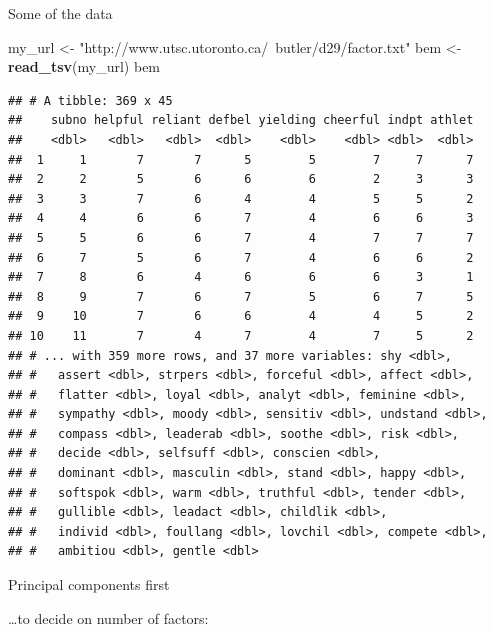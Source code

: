 \documentclass[
  ignorenonframetext,
]{beamer}
\newenvironment{Shaded}{\begin{snugshade}}{\end{snugshade}}
\newcommand{\DataTypeTok}[1]{\textcolor[rgb]{0.13,0.29,0.53}{#1}}
\newcommand{\KeywordTok}[1]{\textcolor[rgb]{0.13,0.29,0.53}{\textbf{#1}}}
\newcommand{\NormalTok}[1]{#1}
\newcommand{\OperatorTok}[1]{\textcolor[rgb]{0.81,0.36,0.00}{\textbf{#1}}}
\newcommand{\StringTok}[1]{\textcolor[rgb]{0.31,0.60,0.02}{#1}}
\begin{document}
\begin{frame}[fragile]{Some of the data}
\protect\hypertarget{some-of-the-data}{}

\scriptsize

\begin{Shaded}
\begin{Highlighting}[]
\NormalTok{my_url <-}\StringTok{ "http://www.utsc.utoronto.ca/~butler/d29/factor.txt"}
\NormalTok{bem <-}\StringTok{ }\KeywordTok{read_tsv}\NormalTok{(my_url)}
\NormalTok{bem}
\end{Highlighting}
\end{Shaded}

\begin{verbatim}
## # A tibble: 369 x 45
##    subno helpful reliant defbel yielding cheerful indpt athlet
##    <dbl>   <dbl>   <dbl>  <dbl>    <dbl>    <dbl> <dbl>  <dbl>
##  1     1       7       7      5        5        7     7      7
##  2     2       5       6      6        6        2     3      3
##  3     3       7       6      4        4        5     5      2
##  4     4       6       6      7        4        6     6      3
##  5     5       6       6      7        4        7     7      7
##  6     7       5       6      7        4        6     6      2
##  7     8       6       4      6        6        6     3      1
##  8     9       7       6      7        5        6     7      5
##  9    10       7       6      6        4        4     5      2
## 10    11       7       4      7        4        7     5      2
## # ... with 359 more rows, and 37 more variables: shy <dbl>,
## #   assert <dbl>, strpers <dbl>, forceful <dbl>, affect <dbl>,
## #   flatter <dbl>, loyal <dbl>, analyt <dbl>, feminine <dbl>,
## #   sympathy <dbl>, moody <dbl>, sensitiv <dbl>, undstand <dbl>,
## #   compass <dbl>, leaderab <dbl>, soothe <dbl>, risk <dbl>,
## #   decide <dbl>, selfsuff <dbl>, conscien <dbl>,
## #   dominant <dbl>, masculin <dbl>, stand <dbl>, happy <dbl>,
## #   softspok <dbl>, warm <dbl>, truthful <dbl>, tender <dbl>,
## #   gullible <dbl>, leadact <dbl>, childlik <dbl>,
## #   individ <dbl>, foullang <dbl>, lovchil <dbl>, compete <dbl>,
## #   ambitiou <dbl>, gentle <dbl>
\end{verbatim}

\normalsize

\end{frame}

\begin{frame}[fragile]{Principal components first}
\protect\hypertarget{principal-components-first}{}

\ldots to decide on number of factors:

\begin{Shaded}
\end{Shaded}

\end{frame}
\end{document}
